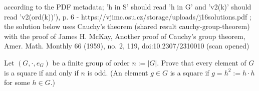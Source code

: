 according to the PDF metadata; 'h in S' should read 'h in G' and 'v2(k)' should read 'v2(ord(k))'), p. 6 - https://vjimc.osu.cz/storage/uploads/j16solutions.pdf ; the solution below uses Cauchy's theorem (shared result cauchy-group-theorem) with the proof of James H. McKay, Another proof of Cauchy's group theorem, Amer. Math. Monthly 66 (1959), no. 2, 119, doi:10.2307/2310010 (scan opened)
%
\begin{problem}
    Let \( \left( G, \cdot, e_G \right) \) be a finite group of order \( n := \left| G \right| \). Prove that every element of \( G \) is a square if and only if \( n \) is odd. (An element \( g \in G \) is a square if \( g = h^{2} := h \cdot h \) for some \( h \in G \).)
\end{problem}
